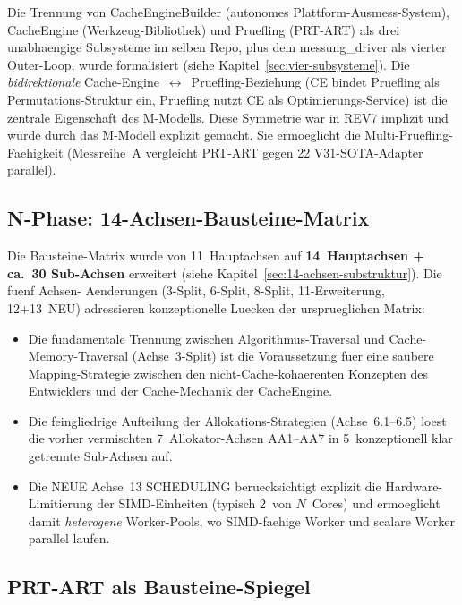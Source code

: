 Die Trennung von CacheEngineBuilder (autonomes
Plattform-Ausmess-System), CacheEngine (Werkzeug-Bibliothek) und
Pruefling (PRT-ART) als drei unabhaengige Subsysteme im selben
Repo, plus dem messung\_driver als vierter Outer-Loop, wurde
formalisiert (siehe Kapitel~\ref{sec:vier-subsysteme}). Die
\emph{bidirektionale} Cache-Engine~$\leftrightarrow$~Pruefling-Beziehung
(CE bindet Pruefling als Permutations-Struktur ein, Pruefling nutzt
CE als Optimierungs-Service) ist die zentrale Eigenschaft des
M-Modells. Diese Symmetrie war in REV7 implizit und wurde durch das
M-Modell explizit gemacht. Sie ermoeglicht die Multi-Pruefling-Faehigkeit
(Messreihe~A vergleicht PRT-ART gegen 22 V31-SOTA-Adapter parallel).

\subsection{N-Phase: 14-Achsen-Bausteine-Matrix}

Die Bausteine-Matrix wurde von 11~Hauptachsen auf
\textbf{14~Hauptachsen + ca.~30 Sub-Achsen} erweitert
(siehe Kapitel~\ref{sec:14-achsen-substruktur}). Die fuenf Achsen-
Aenderungen (3-Split, 6-Split, 8-Split, 11-Erweiterung, 12+13~NEU)
adressieren konzeptionelle Luecken der ursprueglichen Matrix:

\begin{itemize}
    \item Die fundamentale Trennung zwischen Algorithmus-Traversal und
    Cache-Memory-Traversal (Achse~3-Split) ist die Voraussetzung fuer
    eine saubere Mapping-Strategie zwischen den nicht-Cache-kohaerenten
    Konzepten des Entwicklers und der Cache-Mechanik der CacheEngine.

    \item Die feingliedrige Aufteilung der Allokations-Strategien
    (Achse~6.1--6.5) loest die vorher vermischten 7~Allokator-Achsen
    AA1--AA7 in 5~konzeptionell klar getrennte Sub-Achsen auf.

    \item Die NEUE Achse~13 SCHEDULING beruecksichtigt explizit die
    Hardware-Limitierung der SIMD-Einheiten (typisch 2~von $N$~Cores)
    und ermoeglicht damit \emph{heterogene} Worker-Pools, wo
    SIMD-faehige Worker und scalare Worker parallel laufen.
\end{itemize}

\subsection{PRT-ART als Bausteine-Spiegel}

